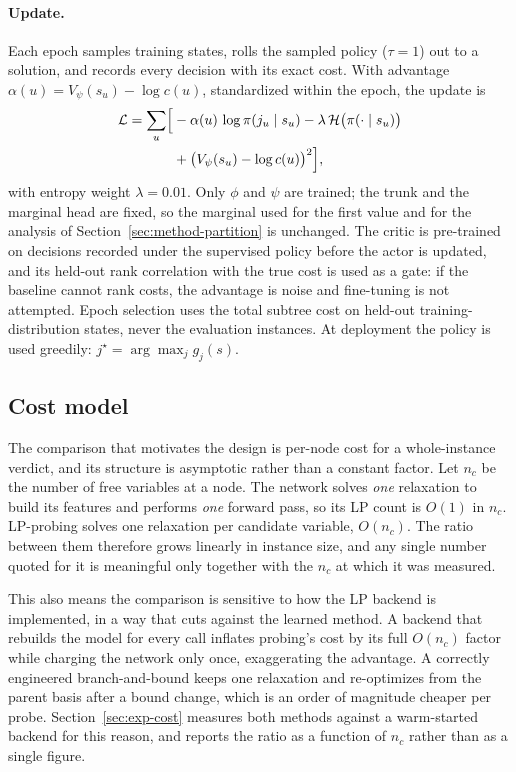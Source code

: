 \documentclass[preprint,12pt]{elsarticle}
\begin{document}
\paragraph{Update.} Each epoch samples training states, rolls the sampled policy ($\tau=1$) out to a solution, and records every decision with its exact cost. With advantage $\alpha(u)=V_\psi(s_u)-\log c(u)$, standardized within the epoch, the update is
\begin{equation}
\begin{split}
\mathcal{L} = \sum_u \Bigl[&-\alpha(u)\,\log\pi(j_u\mid s_u) - \lambda\,\mathcal{H}\bigl(\pi(\cdot\mid s_u)\bigr)\\
&+ \bigl(V_\psi(s_u)-\log c(u)\bigr)^2\Bigr],
\end{split}
\end{equation}
with entropy weight $\lambda=0.01$. Only $\phi$ and $\psi$ are trained; the trunk and the marginal head are fixed, so the marginal used for the first value and for the analysis of Section~\ref{sec:method-partition} is unchanged. The critic is pre-trained on decisions recorded under the supervised policy before the actor is updated, and its held-out rank correlation with the true cost is used as a gate: if the baseline cannot rank costs, the advantage is noise and fine-tuning is not attempted. Epoch selection uses the total subtree cost on held-out training-distribution states, never the evaluation instances. At deployment the policy is used greedily: $j^\star=\arg\max_j g_j(s)$.

\subsection{Cost model}
\label{sec:method-cost}

The comparison that motivates the design is per-node cost for a whole-instance verdict, and its structure is asymptotic rather than a constant factor. Let $n_c$ be the number of free variables at a node. The network solves \emph{one} relaxation to build its features and performs \emph{one} forward pass, so its LP count is $O(1)$ in $n_c$. LP-probing solves one relaxation per candidate variable, $O(n_c)$. The ratio between them therefore grows linearly in instance size, and any single number quoted for it is meaningful only together with the $n_c$ at which it was measured.

This also means the comparison is sensitive to how the LP backend is implemented, in a way that cuts against the learned method. A backend that rebuilds the model for every call inflates probing's cost by its full $O(n_c)$ factor while charging the network only once, exaggerating the advantage. A correctly engineered branch-and-bound keeps one relaxation and re-optimizes from the parent basis after a bound change, which is an order of magnitude cheaper per probe. Section~\ref{sec:exp-cost} measures both methods against a warm-started backend for this reason, and reports the ratio as a function of $n_c$ rather than as a single figure.
\end{document}
